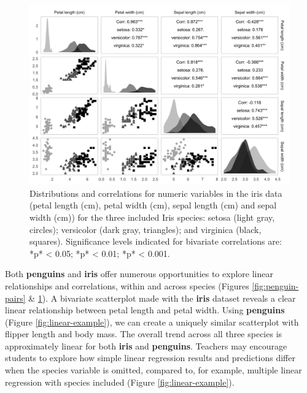 \begin{Schunk}
\begin{figure}

{\centering \includegraphics[width=\textwidth]{figs/iris-pairs-1} 

}

\caption[Distributions and correlations for numeric variables in the iris data (petal length (cm), petal width (cm), sepal length (cm) and sepal width (cm)) for the three included Iris species]{Distributions and correlations for numeric variables in the iris data (petal length (cm), petal width (cm), sepal length (cm) and sepal width (cm)) for the three included Iris species: setosa (light gray, circles); versicolor (dark gray, triangles); and virginica (black, squares). Significance levels indicated for bivariate correlations are: \**p* < 0.05; \*\**p* < 0.01; \*\*\**p* < 0.001.}\label{fig:iris-pairs}
\end{figure}
\end{Schunk}

Both \textbf{penguins} and \textbf{iris} offer numerous opportunities to
explore linear relationships and correlations, within and across species
(Figures \ref{fig:penguin-pairs} \& \ref{fig:iris-pairs}). A bivariate
scatterplot made with the \textbf{iris} dataset reveals a clear linear
relationship between petal length and petal width. Using
\textbf{penguins} (Figure \ref{fig:linear-example}), we can create a
uniquely similar scatterplot with flipper length and body mass. The
overall trend across all three species is approximately linear for both
\textbf{iris} and \textbf{penguins}. Teachers may encourage students to
explore how simple linear regression results and predictions differ when
the species variable is omitted, compared to, for example, multiple
linear regression with species included (Figure
\ref{fig:linear-example}).

